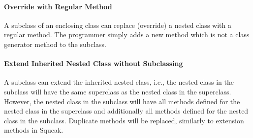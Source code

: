 \paragraph{Override with Regular Method}
A subclass of an enclosing class can replace (override) a nested class with a regular method. The programmer simply adds a new method which is not a class generator method to the subclass.

\paragraph{Extend Inherited Nested Class without Subclassing}
A subclass can extend the inherited nested class, i.e., the nested class in the subclass will have the same superclass as the nested class in the superclass. However, the nested class in the subclass will have all methods defined for the nested class in the superclass and additionally all methods defined for the nested class in the subclass. Duplicate methods will be replaced, similarly to extension methods in Squeak.

